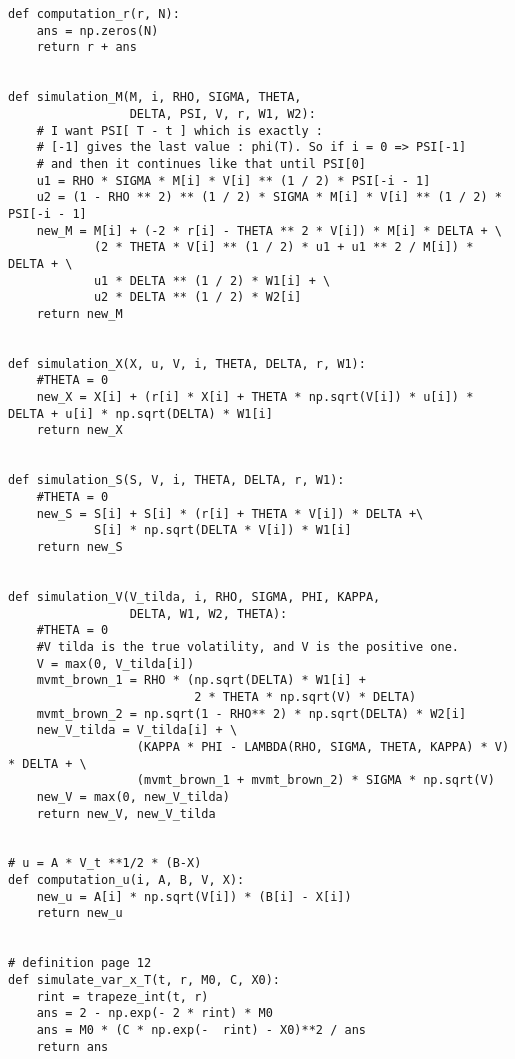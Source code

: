 \begin{Verbatim}[fontsize=\tiny]
def computation_r(r, N):
    ans = np.zeros(N)
    return r + ans


def simulation_M(M, i, RHO, SIGMA, THETA,
                 DELTA, PSI, V, r, W1, W2):
    # I want PSI[ T - t ] which is exactly :
    # [-1] gives the last value : phi(T). So if i = 0 => PSI[-1]
    # and then it continues like that until PSI[0]
    u1 = RHO * SIGMA * M[i] * V[i] ** (1 / 2) * PSI[-i - 1]
    u2 = (1 - RHO ** 2) ** (1 / 2) * SIGMA * M[i] * V[i] ** (1 / 2) * PSI[-i - 1]
    new_M = M[i] + (-2 * r[i] - THETA ** 2 * V[i]) * M[i] * DELTA + \
            (2 * THETA * V[i] ** (1 / 2) * u1 + u1 ** 2 / M[i]) * DELTA + \
            u1 * DELTA ** (1 / 2) * W1[i] + \
            u2 * DELTA ** (1 / 2) * W2[i]
    return new_M


def simulation_X(X, u, V, i, THETA, DELTA, r, W1):
    #THETA = 0
    new_X = X[i] + (r[i] * X[i] + THETA * np.sqrt(V[i]) * u[i]) * DELTA + u[i] * np.sqrt(DELTA) * W1[i]
    return new_X


def simulation_S(S, V, i, THETA, DELTA, r, W1):
    #THETA = 0
    new_S = S[i] + S[i] * (r[i] + THETA * V[i]) * DELTA +\
            S[i] * np.sqrt(DELTA * V[i]) * W1[i]
    return new_S


def simulation_V(V_tilda, i, RHO, SIGMA, PHI, KAPPA,
                 DELTA, W1, W2, THETA):
    #THETA = 0
    #V tilda is the true volatility, and V is the positive one.
    V = max(0, V_tilda[i])
    mvmt_brown_1 = RHO * (np.sqrt(DELTA) * W1[i] +
                          2 * THETA * np.sqrt(V) * DELTA)
    mvmt_brown_2 = np.sqrt(1 - RHO** 2) * np.sqrt(DELTA) * W2[i]
    new_V_tilda = V_tilda[i] + \
                  (KAPPA * PHI - LAMBDA(RHO, SIGMA, THETA, KAPPA) * V) * DELTA + \
                  (mvmt_brown_1 + mvmt_brown_2) * SIGMA * np.sqrt(V)
    new_V = max(0, new_V_tilda)
    return new_V, new_V_tilda


# u = A * V_t **1/2 * (B-X)
def computation_u(i, A, B, V, X):
    new_u = A[i] * np.sqrt(V[i]) * (B[i] - X[i])
    return new_u


# definition page 12
def simulate_var_x_T(t, r, M0, C, X0):
    rint = trapeze_int(t, r)
    ans = 2 - np.exp(- 2 * rint) * M0
    ans = M0 * (C * np.exp(-  rint) - X0)**2 / ans
    return ans
\end{Verbatim}

